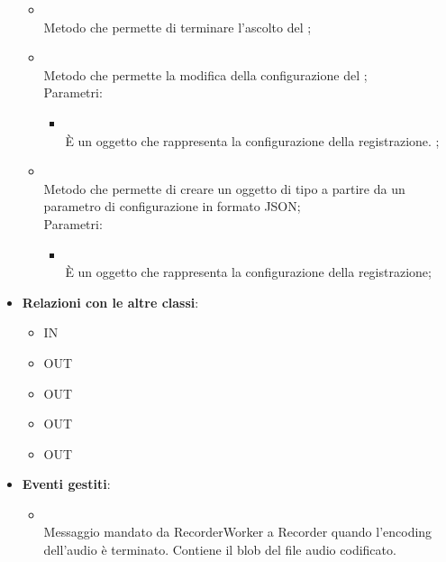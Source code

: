 \begin{itemize}
\begin{itemize}
		\item[]  \\
		Metodo che permette di terminare l'ascolto del ;\\
		\item[]  \\
		Metodo che permette la modifica della configurazione del ;\\
		Parametri:
		\begin{itemize}
			\item {} \\
			È un oggetto che rappresenta la configurazione della registrazione. ;
		\end{itemize}
		\item[]  \\
		Metodo che permette di creare un oggetto di tipo  a partire da un parametro di configurazione in formato JSON;\\
		Parametri:
		\begin{itemize}
			\item {} \\
			È un oggetto che rappresenta la configurazione della registrazione;
		\end{itemize}
	\end{itemize}
	\item \textbf{Relazioni con le altre classi}:
	\begin{itemize}
		\item IN \hyperlink{BoolObserver_label}{}
		\item OUT \hyperlink{RecorderMsg_label}{}
		\item OUT \hyperlink{RecorderWorker_label}{}
		\item OUT \hyperlink{RecorderWorkerMsg_label}{}
		\item OUT \hyperlink{SpeechEndSubject_label}{}
	\end{itemize}
	\item \textbf{Eventi gestiti}:
	\begin{itemize}
\item {} \\ Messaggio mandato da RecorderWorker a Recorder quando l'encoding dell'audio è terminato. Contiene il blob del file audio codificato.	\end{itemize}
\end{itemize}
\FloatBarrier

